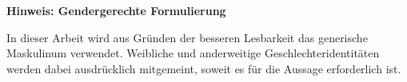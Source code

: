 \thispagestyle{empty}


\vspace*{\fill}

\begin{center}
  \begin{Large}
    \textbf{Hinweis: Gendergerechte Formulierung}
  \end{Large}
\end{center}

\vspace{0.5cm}

\noindent %
\glqq In dieser Arbeit wird aus Gründen der besseren Lesbarkeit das generische Maskulinum verwendet. Weibliche und anderweitige Geschlechteridentitäten werden dabei ausdrücklich mitgemeint, soweit es für die Aussage erforderlich ist.\grqq{}

\vspace*{\fill}
 
\restoregeometry